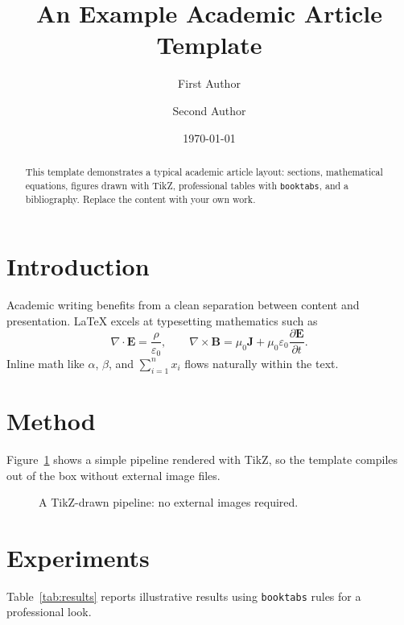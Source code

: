 \documentclass[11pt]{article}
\title{An Example Academic Article Template}
\author{First Author \and Second Author}
\date{\today}
\begin{document}
\maketitle

\begin{abstract}
This template demonstrates a typical academic article layout: sections,
mathematical equations, figures drawn with TikZ, professional tables with
\texttt{booktabs}, and a bibliography. Replace the content with your own work.
\end{abstract}

\section{Introduction}
Academic writing benefits from a clean separation between content and
presentation. \LaTeX{} excels at typesetting mathematics such as
\begin{equation}
  \nabla \cdot \mathbf{E} = \frac{\rho}{\varepsilon_0},
  \qquad
  \nabla \times \mathbf{B} = \mu_0 \mathbf{J} + \mu_0 \varepsilon_0
  \frac{\partial \mathbf{E}}{\partial t}.
\end{equation}
Inline math like $\alpha$, $\beta$, and $\sum_{i=1}^{n} x_i$ flows naturally
within the text.

\section{Method}
Figure~\ref{fig:pipeline} shows a simple pipeline rendered with TikZ, so the
template compiles out of the box without external image files.

\begin{figure}[htbp]
  \centering
  \caption{A TikZ-drawn pipeline: no external images required.}
  \label{fig:pipeline}
\end{figure}

\section{Experiments}
Table~\ref{tab:results} reports illustrative results using \texttt{booktabs}
rules for a professional look.
\end{document}
